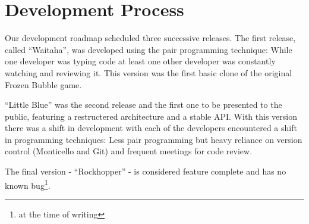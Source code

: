 \section{Development Process}
Our development roadmap scheduled three successive releases. The first release, called ``Waitaha'', was developed using the pair programming technique: While one developer was typing code at least one other developer was constantly watching and reviewing it. This version was the first basic clone of the original Frozen Bubble game.

``Little Blue'' was the second release and the first one to be presented to the public, featuring a restructered architecture and a stable API. With this version there was a shift in development with each of the developers encountered a shift in programming techniques: Less pair programming but heavy reliance on version control (Monticello and Git) and frequent meetings for code review.

The final version - ``Rockhopper'' - is considered feature complete and has no known bug\footnote{at the time of writing}.